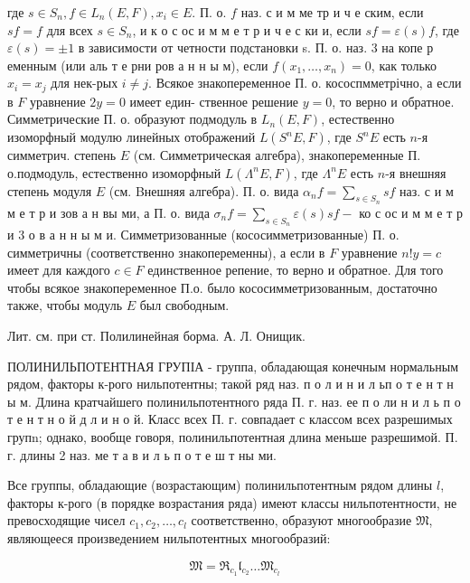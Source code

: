 \documentclass[10pt]{article}
\begin{document}
где $s \in S_{n}, f \in L_{n}(E, F), x_{i} \in E$. П. о. $f$ наз. с и м ме тр и ч е ским, если $s f=f$ для всех $s \in S_{n}$, и к о с ос и м м е т р и ч е с ки и, если $s f=\varepsilon(s) f$, где $\varepsilon(s)= \pm 1$ в зависимости от четности подстановки s. П. о. наз. 3 на копе р еменным (или аль т е рни ров а н н ы м), если $f\left(x_{1}, \ldots, x_{n}\right)=0$, как только $x_{i}=x_{j}$ для нек-рых $i \neq j$. Всякое знакопеременное П. о. кососпмметрічно, а если в $F$ уравнение $2 y=0$ имеет един- ственное решение $y=0$, то верно и обратное. Симметрические П. о. образуют подмодуль в $L_{n}(E, F)$, естественно изоморфный модулю линейных отображений $L\left(S^{n} E, F\right)$, где $S^{n} E$ есть $n$-я симметрич. степень $E$ (см. Симметрическая алгебра), знакопеременные П. о.подмодуль, естественно изоморфный $L\left(\Lambda^{n} E, F\right)$, где $\Lambda^{n} E$ есть $n$-я внешняя степень модуля $E$ (см. Bнешняя алгебра). П. о. вида $\alpha_{n} f=\sum_{s \in S_{n}} s f$ наз. с и м м е т р и зов а н вы ми, а П. о. вида $\sigma_{n} f=\sum_{s \in S_{n}} \varepsilon(s) s f-$ ко с ос и м м е т р и 3 о в а н н ы м и. Симметризованные (кососимметризованные) П. о. симметричны (соответственно знакопеременны), а если в $F$ уравнение $n ! y=c$ имеет для каждого $c \in F$ единственное репение, то верно и обратное. Для того чтобы всякое знакопеременное П.о. было кососимметризованным, достаточно также, чтобы модуль $E$ был свободным.



Лит. см. при ст. Полилинейная борма. А. Л. Онищик.



ПОЛИНИЛЬПОТЕНТНАЯ ГРУПІА - группа, обладающая конечным нормальным рядом, факторы к-рого нильпотентны; такой ряд наз. п о л и н и л ьп о т е н т н ы м. Длина кратчайшего полинильпотентного ряда П. г. наз. ее п о ли н и л ь п о т е н т н о й д л и н о й. Класс всех П. г. совпадает с классом всех разрешимых групn; однако, вообще говоря, полинильпотентная длина меньше разрешимой. П. г. длины 2 наз. ме т а в и л ь п о т е ш т ны ми.



Все группы, обладающие (возрастающим) полинильпотентным рядом длины $l$, факторы к-рого (в порядке возрастания ряда) имеют классы нильпотентности, не превосходящие чисел $c_{1}, c_{2}, \ldots, c_{l}$ соответственно, образуют многообразие $\mathfrak{M}$, являющееся произведением нильпотентных многообразий:



\[

\mathfrak{M}=\mathfrak{R}_{c_{1}} \mathfrak{l}_{c_{2}} \ldots \mathfrak{M}_{c_{l}}

\]
\end{document}
